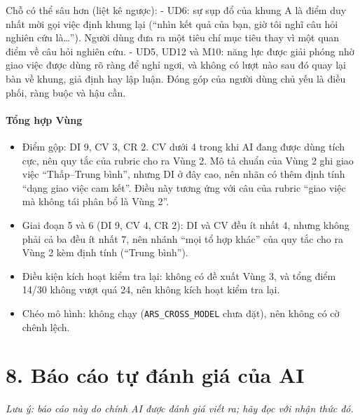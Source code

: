 \documentclass[12pt,a4paper]{article}
\providecommand{\tightlist}{\setlength{\itemsep}{0pt}\setlength{\parskip}{0pt}}
\begin{document}
Chỗ có thể sâu hơn (liệt kê ngược): - UD6: sự sụp đổ của khung A là điểm
duy nhất mời gọi việc định khung lại (``nhìn kết quả của bạn, giờ tôi
nghĩ câu hỏi nghiên cứu là\ldots{}''). Người dùng đưa ra một tiêu chí
mục tiêu thay vì một quan điểm về câu hỏi nghiên cứu. - UD5, UD12 và
M10: năng lực được giải phóng nhờ giao việc được dùng rõ ràng để nghỉ
ngơi, và không có lượt nào sau đó quay lại bàn về khung, giả định hay
lập luận. Đóng góp của người dùng chủ yếu là điều phối, ràng buộc và hậu
cần.

\hypertarget{tux1ed5ng-hux1ee3p-vuxf9ng}{%
\paragraph{Tổng hợp Vùng}\label{tux1ed5ng-hux1ee3p-vuxf9ng}}

\begin{itemize}
\tightlist
\item
  Điểm gộp: DI 9, CV 3, CR 2. CV dưới 4 trong khi AI đang được dùng tích
  cực, nên quy tắc của rubric cho ra Vùng 2. Mô tả chuẩn của Vùng 2 ghi
  giao việc ``Thấp--Trung bình'', nhưng DI ở đây cao, nên nhãn có thêm
  định tính ``dạng giao việc cam kết''. Điều này tương ứng với câu của
  rubric ``giao việc mà không tái phân bổ là Vùng 2''.
\item
  Giai đoạn 5 và 6 (DI 9, CV 4, CR 2): DI và CV đều ít nhất 4, nhưng
  không phải cả ba đều ít nhất 7, nên nhánh ``mọi tổ hợp khác'' của quy
  tắc cho ra Vùng 2 kèm định tính (``Trung bình'').
\item
  Điều kiện kích hoạt kiểm tra lại: không có đề xuất Vùng 3, và tổng
  điểm 14/30 không vượt quá 24, nên không kích hoạt kiểm tra lại.
\item
  Chéo mô hình: không chạy (\texttt{ARS\_CROSS\_MODEL} chưa đặt), nên
  không có cờ chênh lệch.
\end{itemize}

\hypertarget{buxe1o-cuxe1o-tux1ef1-ux111uxe1nh-giuxe1-cux1ee7a-ai}{%
\section{8. Báo cáo tự đánh giá của
AI}\label{buxe1o-cuxe1o-tux1ef1-ux111uxe1nh-giuxe1-cux1ee7a-ai}}

\emph{Lưu ý: báo cáo này do chính AI được đánh giá viết ra; hãy đọc với
nhận thức đó.}
\end{document}
